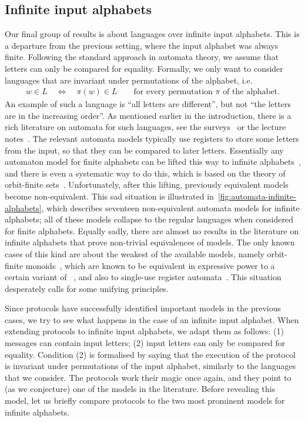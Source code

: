 \subsection{Infinite input alphabets}
\label{sec:intro-infinite}
Our final group of results is about languages over infinite input alphabets. This is a departure from the previous setting, where  the input alphabet was always finite. Following the standard approach in automata theory, we assume that letters can only be compared for equality. Formally, we only want to consider languages that are invariant under permutations of the
alphabet, i.e.
\begin{align*}
w \in L 
\quad \iff \quad
\pi(w) \in L \qquad \text{for every permutation $\pi$ of the alphabet}.
\end{align*}
An example of such a language is ``all letters are different'', but not ``the letters are in the increasing order''.
 As mentioned earlier in the introduction, there is a rich literature on automata for such languages, see the surveys~\cite{neven2003power,segoufin2006automata,bojanczykOrbitFiniteSetsTheir2017} or the lecture notes~\cite{bojanczyk_slightly}.  The  relevant automata models typically use registers to store some letters from the input, so that they can be compared to later letters. Essentially any automaton model for finite alphabets can be lifted this way to infinite alphabets~\cite[Figure 1]{neven2003power}, and there is even a systematic way to do this, which is based on the theory of orbit-finite sets~\cite[Chapter 2]{bojanczyk_slightly}. Unfortunately, after this lifting, previously equivalent models become non-equivalent.  This sad situation is illustrated in~\cref{fig:automata-infinite-alphabets}, which describes seventeen non-equivalent automata models for infinite alphabets; all of these models collapse to the regular languages when considered for finite alphabets. Equally sadly, there are almost no results in the literature on infinite alphabets that prove non-trivial equivalences of models. The only known cases of this kind are about the  weakest of the available models, namely orbit-finite monoids~\cite{bojanczykNominalMonoids2013}, which are known to be equivalent in expressive power to a certain variant of \mso~\cite[Theorems 4.2 and 5.1]{DBLP:journals/corr/ColcombetLP14}, and also to single-use register automata~\cite[Theorem 6]{bojanczykstefanski2020}.
This situation desperately calls for some unifying principles. 

Since protocols have successfully identified important models in the previous
cases, we try to see  what happens in the case of an infinite input alphabet.
When extending protocols to infinite input alphabets, we adapt them as follows:
(1) messages can contain input letters; (2)  input letters can only be compared for
equality. Condition (2) is formalised by saying that the execution of the
protocol is invariant under permutations of the input alphabet, similarly to
the languages that we consider. The protocols  work their magic once again, and
they point to (as we conjecture)  one of the models in the literature. Before
revealing this model, let us briefly compare protocols to the two most prominent models 
for infinite alphabets.

